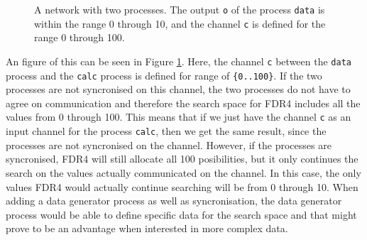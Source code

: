 \begin{figure}
    \centering
    \caption{A \cspm{} network with two processes. The output \texttt{o} of the process \texttt{data} is within the range 0 through 10, and the channel \texttt{c} is defined for the range 0 through 100.}
    \label{fig:csp_data_generator_process}
\end{figure}
An figure of this can be seen in Figure \ref{fig:csp_data_generator_process}. Here, the channel \texttt{c} between the \texttt{data} process and the \texttt{calc} process is defined for range of \texttt{\{0..100\}}. If the two processes are not syncronised on this channel, the two processes do not have to agree on communication and therefore the search space for FDR4 includes all the values from 0 through 100. This means that if we just have the channel \texttt{c} as an input channel for the process \texttt{calc}, then we get the same result, since the processes are not syncronised on the channel.
However, if the processes are syncronised, FDR4 will still allocate all 100 posibilities, but it only continues the search on the values actually communicated on the channel. In this case, the only values FDR4 would actually continue searching will be from 0 through 10.
When adding a data generator process as well as syncronisation, the data generator process would be able to define specific data for the search space and that might prove to be an advantage when interested in more complex data.

